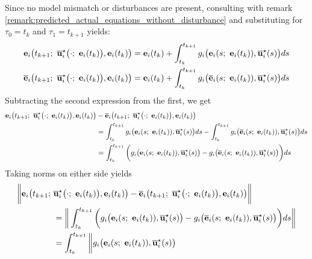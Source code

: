 \begin{gg_box}

Since no model mismatch or disturbances are present, consulting with remark
\eqref{remark:predicted_actual_equations_without_disturbance} and substituting
for $\tau_0 = t_k$ and $\tau_1 = t_{k+1}$ yields:
\begin{align}
  \vect{e}_i\big(t_{k+1};\ \overline{\vect{u}}_i^{\star}\big(\cdot;\ \vect{e}_i(t_k)\big), \vect{e}_i(t_k)\big) &=
    \vect{e}_i(t_k) + \int_{t_k}^{t_{k+1}} g_i\big(\vect{e}_i(s;\ \vect{e}_i(t_k)), \overline{\vect{u}}_i^{\star}(s)\big) ds \\
  \overline{\vect{e}}_i\big(t_{k+1};\ \overline{\vect{u}}_i^{\star}\big(\cdot;\ \vect{e}_i(t_k)\big), \vect{e}_i(t_k)\big) &=
    \vect{e}_i(t_k) + \int_{t_k}^{t_{k+1}} g_i\big(\overline{\vect{e}}_i(s;\ \vect{e}_i(t_k)), \overline{\vect{u}}_i^{\star}(s)\big) ds
\end{align}
Subtracting the second expression from the first, we get
\begin{align}
  \vect{e}_i\big(t_{k+1};\ \overline{\vect{u}}_i^{\star}\big(\cdot;\ \vect{e}_i(t_k)\big), \vect{e}_i(t_k)\big) &-
  \overline{\vect{e}}_i\big(t_{k+1};\ \overline{\vect{u}}_i^{\star}\big(\cdot;\ \vect{e}_i(t_k)\big), \vect{e}_i(t_k)\big) \\
  &=\int_{t_k}^{t_{k+1}} g_i\big(\vect{e}_i(s;\ \vect{e}_i(t_k)), \overline{\vect{u}}_i^{\star}(s)\big) ds -
    \int_{t_k}^{t_{k+1}} g_i\big(\overline{\vect{e}}_i(s;\ \vect{e}_i(t_k)), \overline{\vect{u}}_i^{\star}(s)\big) ds\\
  &=\int_{t_k}^{t_{k+1}} \bigg( g_i\big(\vect{e}_i(s;\ \vect{e}_i(t_k)), \overline{\vect{u}}_i^{\star}(s)\big)
  - g_i\big(\overline{\vect{e}}_i(s;\ \vect{e}_i(t_k)), \overline{\vect{u}}_i^{\star}(s)\big) \bigg) ds \\
\end{align}
Taking norms on either side yields
\begin{align}
  \bigg\|\vect{e}_i\big(t_{k+1};\ &\overline{\vect{u}}_i^{\star}\big(\cdot;\ \vect{e}_i(t_k)\big), \vect{e}_i(t_k)\big)
    -\overline{\vect{e}}_i\big(t_{k+1};\ \overline{\vect{u}}_i^{\star}\big(\cdot;\ \vect{e}_i(t_k)\big), \vect{e}_i(t_k)\big) \bigg\| \\
  &=\bigg\|\int_{t_k}^{t_{k+1}} \bigg( g_i\big(\vect{e}_i(s;\ \vect{e}_i(t_k)), \overline{\vect{u}}_i^{\star}(s)\big)
  - g_i\big(\overline{\vect{e}}_i(s;\ \vect{e}_i(t_k)), \overline{\vect{u}}_i^{\star}(s)\big) \bigg) ds \bigg\|\\
  &=\int_{t_k}^{t_{k+1}} \bigg\| g_i\big(\vect{e}_i(s;\ \vect{e}_i(t_k)), \overline{\vect{u}}_i^{\star}(s)\big)

\end{align}
\end{gg_box}
